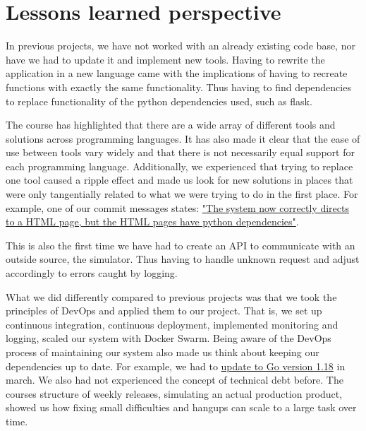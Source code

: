 \section{Lessons learned perspective}

In previous projects, we have not worked with an already existing code base, nor have we had to update it and implement new tools. Having to rewrite the application in a new language came with the implications of having to recreate functions with exactly the same functionality. Thus having to find dependencies to replace functionality of the python dependencies used, such as flask.


The course has highlighted that there are a wide array of different tools and solutions across programming languages. It has also made it clear that the ease of use between tools vary widely and that there is not necessarily equal support for each programming language. Additionally, we experienced that trying to replace one tool caused a ripple effect and made us look for new solutions in places that were only tangentially related to what we were trying to do in the first place. For example, one of our commit messages states: \href{https://github.com/salsitu/minitwit_thesvindler/commit/b0a6703feba3e1e3453358d563e0cce79fe8b6e3}{"The system now correctly directs to a HTML page, but the HTML pages have python dependencies"}.


This is also the first time we have had to create an API to communicate with an outside source, the simulator. Thus having to handle unknown request and adjust accordingly to errors caught by logging.


What we did differently compared to previous projects was that we took the principles of DevOps and applied them to our project. That is, we set up continuous integration, continuous deployment, implemented monitoring and logging, scaled our system with Docker Swarm. Being aware of the DevOps process of maintaining our system also made us think about keeping our dependencies up to date. For example, we had to \href{https://github.com/salsitu/minitwit_thesvindler/commit/7785e42ec56e38445815946b7efa980dc9502044}{ update to Go version 1.18} in march.
We also had not experienced the concept of technical debt before. The courses structure of weekly releases, simulating an actual production product, showed us how fixing small difficulties and hangups can scale to a large task over time.


